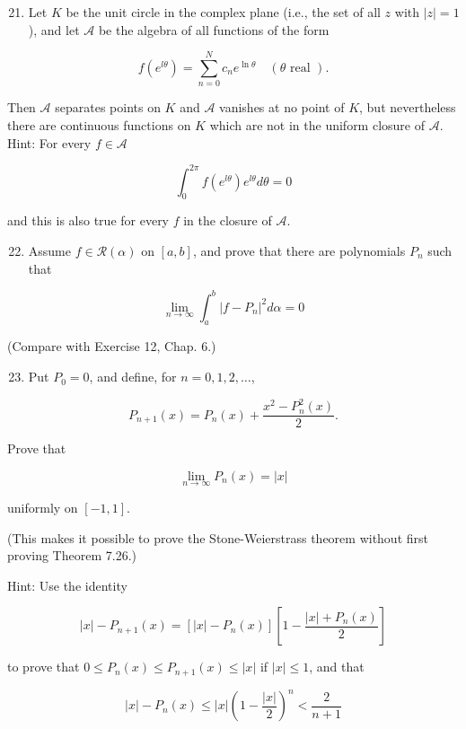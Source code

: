 \documentclass[10pt]{article}
\begin{document}
\begin{enumerate}
  \setcounter{enumi}{20}
  \item Let $K$ be the unit circle in the complex plane (i.e., the set of all $z$ with $|z|=1$ ), and let $\mathscr{A}$ be the algebra of all functions of the form
\end{enumerate}

$$
f\left(e^{l \theta}\right)=\sum_{n=0}^{N} c_{n} e^{\ln \theta} \quad(\theta \text { real }) .
$$

Then $\mathscr{A}$ separates points on $K$ and $\mathscr{A}$ vanishes at no point of $K$, but nevertheless there are continuous functions on $K$ which are not in the uniform closure of $\mathscr{A}$. Hint: For every $f \in \mathscr{A}$

$$
\int_{0}^{2 \pi} f\left(e^{l \theta}\right) e^{l \theta} d \theta=0
$$

and this is also true for every $f$ in the closure of $\mathscr{A}$.

\begin{enumerate}
  \setcounter{enumi}{21}
  \item Assume $f \in \mathscr{R}(\alpha)$ on $[a, b]$, and prove that there are polynomials $P_{n}$ such that
\end{enumerate}

$$
\lim _{n \rightarrow \infty} \int_{a}^{b}\left|f-P_{n}\right|^{2} d \alpha=0
$$

(Compare with Exercise 12, Chap. 6.)

\begin{enumerate}
  \setcounter{enumi}{22}
  \item Put $P_{0}=0$, and define, for $n=0,1,2, \ldots$,
\end{enumerate}

$$
P_{n+1}(x)=P_{n}(x)+\frac{x^{2}-P_{n}^{2}(x)}{2} .
$$

Prove that

$$
\lim _{n \rightarrow \infty} P_{n}(x)=|x|
$$

uniformly on $[-1,1]$.

(This makes it possible to prove the Stone-Weierstrass theorem without first proving Theorem 7.26.)

Hint: Use the identity

$$
|x|-P_{n+1}(x)=\left[|x|-P_{n}(x)\right]\left[1-\frac{|x|+P_{n}(x)}{2}\right]
$$

to prove that $0 \leq P_{n}(x) \leq P_{n+1}(x) \leq|x|$ if $|x| \leq 1$, and that

$$
|x|-P_{n}(x) \leq|x|\left(1-\frac{|x|}{2}\right)^{n}<\frac{2}{n+1}
$$
\end{document}

